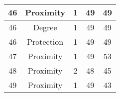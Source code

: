 \documentclass[results.tex]{subfiles}
\begin{document}
\begin{center}
\begin{tabular}{| c || c | c | c | c |}
            \hline
            46                      & Proximity                    & 1                      & 49                      & 49                   \\
            \hline
            46                      & Degree                       & 1                      & 49                      & 49                   \\
            \hline
            46                      & Protection                   & 1                      & 49                      & 49                   \\
            \hline
            47                      & Proximity                    & 1                      & 49                      & 53                   \\
            \hline
            48                      & Proximity                    & 2                      & 48                      & 45                   \\
            \hline
            49                      & Proximity                    & 1                      & 49                      & 43                   \\
            \hline
        \end{tabular}
    \end{center}
\end{document}
